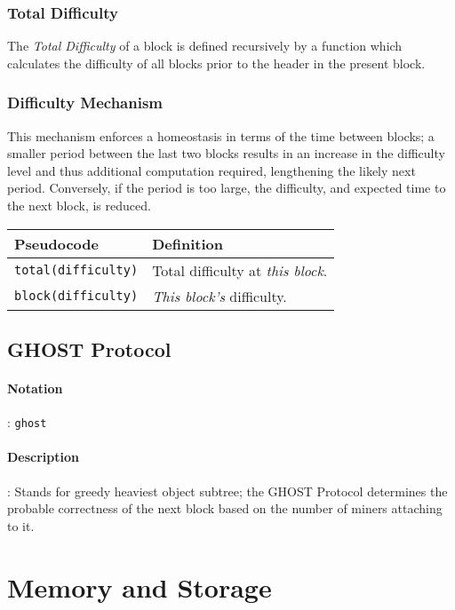 \documentclass[10pt,a4paper,leqno,bibliography=totoc]{scrartcl}
\newenvironment{alphafootnotes}
{\par\edef\savedfootnotenumber{\number\value{footnote}}
\renewcommand{\thefootnote}{\alph{footnote}}
\setcounter{footnote}{0}}
{\par\setcounter{footnote}{\savedfootnotenumber}}
\begin{document}
\begin{alphafootnotes}
\begin{multicols*}{2}
			\subsubsection{Total Difficulty}
				The \textit{Total Difficulty} of a block is defined recursively by a function which calculates the difficulty of all blocks prior to the header in the present block. 
				
			\subsubsection{Difficulty Mechanism}
				This mechanism enforces a homeostasis in terms of the time between blocks; a smaller period between the last two blocks results in an increase in the difficulty level and thus additional computation required, lengthening the likely next period. Conversely, if the period is too large, the difficulty, and expected time to the next block, is reduced.\supercite{Wood2017}
		
	\flushleft			
   \begin{tabular}{ll}
	   \toprule
	   \textbf{Pseudocode} & \textbf{Definition} \\
	   \midrule
	   \texttt{\scriptsize{total(difficulty)}} & \scriptsize{Total difficulty at \textsl{this block}.} \\
	   \texttt{\scriptsize{block(difficulty)}} & \scriptsize{\textsl{This block's} difficulty.} \\
	   \bottomrule
   \end{tabular}

	\subsection{GHOST Protocol}
		\paragraph{Notation}: \texttt{ghost}
		\paragraph{Description}: Stands for greedy heaviest object subtree; the GHOST Protocol determines the probable correctness of the next block based on the number of miners attaching to it.
		
	
	\justify

	\section{Memory and Storage}
			

\end{multicols*}
\end{alphafootnotes}
\end{document}
